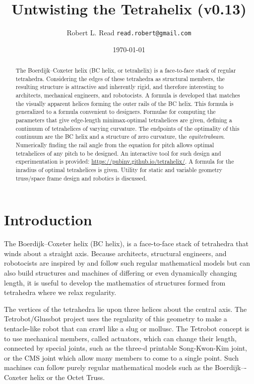 \documentclass[11pt]{article}
\title{Untwisting the Tetrahelix (v0.13)}
\author{Robert L. Read \texttt{read.robert@gmail.com}
}
\date{\today}
\begin{document}
\maketitle


\begin{abstract}
  The Boerdijk--Coxeter helix (BC helix, or tetrahelix) is a
  face-to-face stack of regular tetrahedra.  Considering the edges of
  these tetrahedra as structural members, the resulting structure is attractive and
  inherently rigid, and therefore interesting to architects,
  mechanical engineers, and robotocists.  A formula is developed that matches the
  visually apparent helices forming the outer rails of the BC helix.
  This formula is generalized to a formula convenient to designers.
  Formulae for 
  computing the
  parameters that give edge-length minimax-optimal tetrahelices
  are given, defining a continuum of tetrahelices of varying curvature.
  The endpoints of the optimality of this continuum are the BC helix and
  a structure of zero curvature, the \emph{equitetrabeam}.
  Numerically finding the rail angle from the equation for
  pitch allows optimal tetrahelices of any pitch to be designed. 
  An interactive tool for such design and experimentation is provided: \url{https://pubinv.github.io/tetrahelix/}.
  A formula for the inradius of optimal tetrahelices is given.
  Utility for static and variable geometry
  truss/space frame design and robotics is discussed.
\end{abstract}


\section{Introduction}

The Boerdijk--Coxeter helix\cite{coxeter1985simplicial} (BC helix), is
a face-to-face stack of tetrahedra that winds about a straight axis.
Because architects, structural engineers, and robotocists are inspired
by and follow such regular mathematical models but can also build structures and
machines of differing or even dynamically changing length, it is
useful to develop the mathematics of structures formed from tetrahedra
where we relax regularity.


The vertices of the tetrahedra lie upon
three helices about the central axis.  The
Tetrobot/Glussbot\cite{TetrobotBook} project uses the regularity of
this geometry to make a tentacle-like robot that can crawl like a slug
or mollusc.  The Tetrobot concept is to use mechanical members, called
actuators, which can change their length, connected by special joints,
such as the three-d printable Song-Kwon-Kim\cite{song2003spherical} joint, or the CMS joint\cite{HamlinSandersonCMS}
which allow many members to come to a single point.
Such machines can
follow purely regular mathematical models such as the Boerdijk–-Coxeter
helix or the Octet Truss\cite{richard1961synergetic}.
\end{document}
